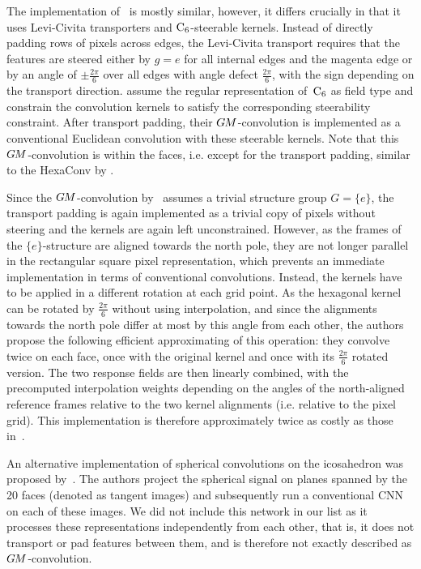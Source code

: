The implementation of~\citet{gaugeIco2019} is mostly similar, however, it differs crucially in that it uses Levi-Civita transporters and $\operatorname{C}_{6}$-steerable kernels.
Instead of directly padding rows of pixels across edges, the Levi-Civita transport requires that the features are steered either by $g=e$ for all internal edges and the magenta edge or by an angle of $\pm\frac{2\pi}{6}$ over all edges with angle defect $\frac{2\pi}{6}$, with the sign depending on the transport direction.
\citet{gaugeIco2019} assume the regular representation of~$\operatorname{C}_{6}$ as field type and constrain the convolution kernels to satisfy the corresponding steerability constraint.
After transport padding, their $G\mkern-1.4muM$-convolution is implemented as a conventional Euclidean convolution with these steerable kernels.
Note that this $G\mkern-1.4muM$-convolution is within the faces, i.e. except for the transport padding, similar to the HexaConv by \citet{Hoogeboom2018-HEX}.


Since the $G\mkern-1.4muM$-convolution by~\citet{zhang2019orientation} assumes a trivial structure group $G=\{e\}$, the transport padding is again implemented as a trivial copy of pixels without steering and the kernels are again left unconstrained.
However, as the frames of the $\{e\}$-structure are aligned towards the north pole, they are not longer parallel in the rectangular square pixel representation, which prevents an immediate implementation in terms of conventional convolutions.
Instead, the kernels have to be applied in a different rotation at each grid point.
As the hexagonal kernel can be rotated by $\frac{2\pi}{6}$ without using interpolation, and since the alignments towards the north pole differ at most by this angle from each other, the authors propose the following efficient approximating of this operation:
they convolve twice on each face, once with the original kernel and once with its $\frac{2\pi}{6}$ rotated version.
The two response fields are then linearly combined, with the precomputed interpolation weights depending on the angles of the north-aligned reference frames relative to the two kernel alignments (i.e. relative to the pixel grid).
This implementation is therefore approximately twice as costly as those in~\cite{liu2018icoAltAz,gaugeIco2019}.


An alternative implementation of spherical convolutions on the icosahedron was proposed by~\citet{eder2020tangent}.
The authors project the spherical signal on planes spanned by the 20 faces (denoted as tangent images) and subsequently run a conventional CNN on each of these images.
We did not include this network in our list as it processes these representations independently from each other, that is, it does not transport or pad features between them, and is therefore not exactly described as $G\mkern-1.4muM$-convolution.


